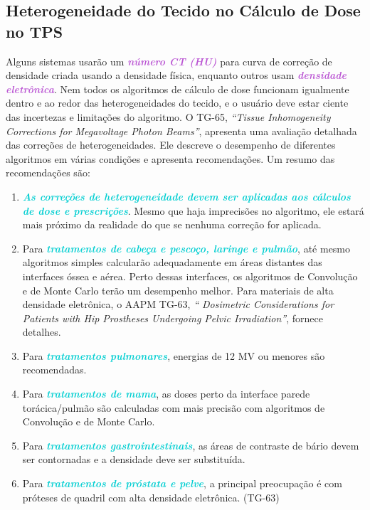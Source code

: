 \documentclass[11pt,a4paper]{article}
\begin{document}
\subsection*{Heterogeneidade do Tecido no Cálculo de Dose no TPS}

	Alguns sistemas usarão um \textcolor{MediumOrchid}{\textbf{\textit{número CT (HU)}}} para curva de correção de densidade criada usando a densidade física, enquanto outros usam \textcolor{MediumOrchid}{\textbf{\textit{densidade eletrônica}}}. Nem todos os algoritmos de cálculo de dose funcionam igualmente dentro e ao redor das heterogeneidades do tecido, e o usuário deve estar ciente das incertezas e limitações do algoritmo. O TG-65, \textit{``Tissue Inhomogeneity Corrections for Megavoltage Photon Beams''}, apresenta uma avaliação detalhada das correções de heterogeneidades. Ele descreve o desempenho de diferentes algoritmos em várias condições e apresenta recomendações. Um resumo das recomendações são:

	\begin{enumerate}[label=\textcolor{CarnationPink}{\roman*.}]
		\item \textcolor{DarkTurquoise}{\textbf{\textit{As correções de heterogeneidade devem ser aplicadas aos cálculos de dose e prescrições}}}. Mesmo que haja imprecisões no algoritmo, ele estará mais próximo da realidade do que se nenhuma correção for aplicada.
		
		\item Para \textcolor{DarkTurquoise}{\textbf{\textit{tratamentos de cabeça e pescoço, laringe e pulmão}}}, até mesmo algoritmos simples calcularão adequadamente em áreas distantes das interfaces óssea e aérea. Perto dessas interfaces, os algoritmos de Convolução e de Monte Carlo terão um desempenho melhor. Para materiais de alta densidade eletrônica, o AAPM TG-63, \textit{`` Dosimetric Considerations for Patients with Hip Prostheses Undergoing Pelvic Irradiation''}, fornece detalhes.
		
		\item Para \textcolor{DarkTurquoise}{\textbf{\textit{tratamentos pulmonares}}}, energias de 12 MV ou menores são recomendadas.
		
		\item Para \textcolor{DarkTurquoise}{\textbf{\textit{tratamentos de mama}}}, as doses perto da interface parede torácica/pulmão são calculadas com mais precisão com algoritmos de Convolução e de Monte Carlo.
		
		\item Para \textcolor{DarkTurquoise}{\textbf{\textit{tratamentos gastrointestinais}}}, as áreas de contraste de bário devem ser contornadas e a densidade deve ser substituída.
		
		\item Para \textcolor{DarkTurquoise}{\textbf{\textit{tratamentos de próstata e pelve}}}, a principal preocupação é com próteses de quadril com alta densidade eletrônica. (TG-63)
	\end{enumerate}
\end{document}
